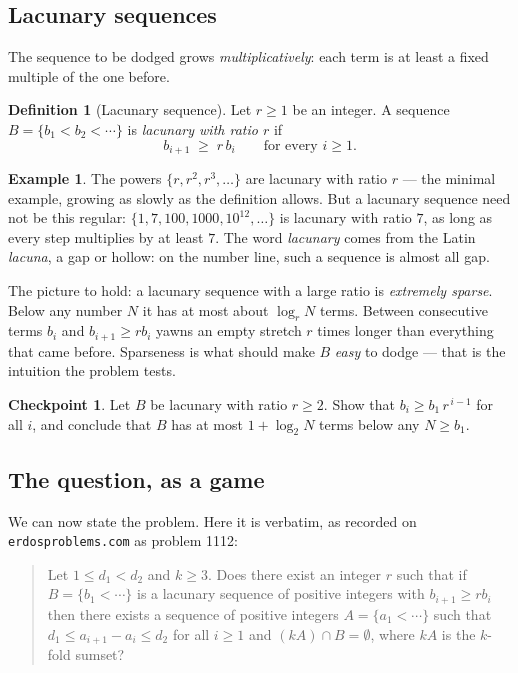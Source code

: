 \documentclass[11pt,reqno]{amsart}
\theoremstyle{plain}
\theoremstyle{definition}
\newtheorem{definition}[theorem]{Definition}
\newtheorem{example}[theorem]{Example}
\newtheorem{checkpoint}[theorem]{Checkpoint}   %
\theoremstyle{remark}
\begin{document}
\subsection{Lacunary sequences}

The sequence to be dodged grows \emph{multiplicatively}: each term is at least a fixed
multiple of the one before.

\begin{definition}[Lacunary sequence]\label{def:lacunary}
Let $r \ge 1$ be an integer. A sequence $B = \{b_1 < b_2 < \cdots\}$ is \emph{lacunary
with ratio $r$} if
\[
  b_{i+1} \;\ge\; r \, b_i \qquad \text{for every } i \ge 1.
\]
\end{definition}

\begin{example}
The powers $\{r, r^2, r^3, \dots\}$ are lacunary with ratio $r$ --- the minimal
example, growing as slowly as the definition allows. But a lacunary sequence need not
be this regular: $\{1, 7, 100, 1000, 10^{12}, \dots\}$ is lacunary with ratio $7$, as
long as every step multiplies by at least $7$. The word \emph{lacunary} comes from the
Latin \emph{lacuna}, a gap or hollow: on the number line, such a sequence is almost all
gap.
\end{example}

The picture to hold: a lacunary sequence with a large ratio is \emph{extremely sparse}.
Below any number $N$ it has at most about $\log_r N$ terms. Between consecutive terms
$b_i$ and $b_{i+1} \ge r b_i$ yawns an empty stretch $r$ times longer than everything
that came before. Sparseness is what should make $B$ \emph{easy} to dodge --- that is
the intuition the problem tests.

\begin{checkpoint}
Let $B$ be lacunary with ratio $r \ge 2$. Show that $b_i \ge b_1 \, r^{\,i-1}$ for all
$i$, and conclude that $B$ has at most $1 + \log_2 N$ terms below any $N \ge b_1$.
\end{checkpoint}

\subsection{The question, as a game}\label{sec:game}

We can now state the problem. Here it is verbatim, as recorded on
\texttt{erdosproblems.com} as problem 1112:

\begin{quote}
Let $1 \le d_1 < d_2$ and $k \ge 3$. Does there exist an integer $r$ such that if
$B = \{b_1 < \cdots\}$ is a lacunary sequence of positive integers with
$b_{i+1} \ge r b_i$ then there exists a sequence of positive integers
$A = \{a_1 < \cdots\}$ such that $d_1 \le a_{i+1} - a_i \le d_2$ for all $i \ge 1$ and
$(kA) \cap B = \emptyset$, where $kA$ is the $k$-fold sumset?
\end{quote}
\end{document}
